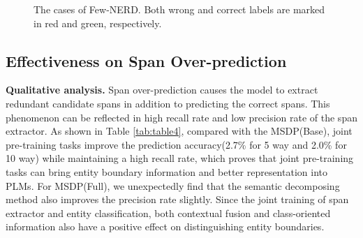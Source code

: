 \documentclass[sigconf,natbib=true,anonymous=False]{acmart}
\begin{document}
\begin{table}[t]
  \centering
    \caption{The span extractor performance (average Precision and Recall) on Few-NERD 1-2 shot. MSDP(Base) denotes MSDP without two pre-training and prototypes.}
  \label{tab:table4}\end{table}



\begin{figure}[t]
\centering
{}
\vspace{-0.2cm} 
\caption{The cases of Few-NERD. Both wrong and correct labels are marked in red and green, respectively. }

\label{fig:case}
\vspace{-0cm} 
\end{figure}





\subsection{Effectiveness on Span Over-prediction}

\textbf{Qualitative analysis.} Span over-prediction causes the model to extract redundant candidate spans in addition to predicting the correct spans.  This phenomenon can be reflected in high recall rate and low precision rate of the span extractor. As shown in Table \ref{tab:table4}, compared with the MSDP(Base), joint pre-training tasks improve the prediction accuracy(2.7\% for 5 way and 2.0\% for 10 way) while maintaining a high recall rate, which proves that joint pre-training tasks can bring entity boundary information and better representation into PLMs. For MSDP(Full), we unexpectedly find that the semantic decomposing method also improves the precision rate slightly. Since the joint training of span extractor and entity classification, both contextual fusion and class-oriented information also have a positive effect on distinguishing entity boundaries.
\end{document}
